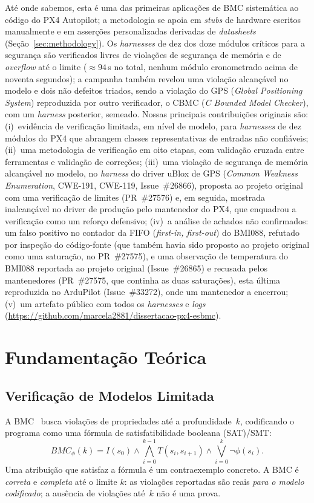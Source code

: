\documentclass[conference]{IEEEtran}
\begin{document}
Até onde sabemos, esta é uma das primeiras aplicações de BMC
sistemática ao código do PX4 Autopilot; a metodologia se apoia em
\textit{stubs} de hardware escritos manualmente e em asserções
personalizadas derivadas de \textit{datasheets}
(Seção~\ref{sec:methodology}). Os \textit{harnesses} de dez dos doze
módulos críticos para a segurança são verificados livres de violações
de segurança de memória e de \textit{overflow} até o limite
(${\approx}94$\,s no total, nenhum módulo cronometrado acima de
noventa segundos); a campanha também revelou uma violação alcançável
no modelo e dois não defeitos triados, sendo a violação do GPS
(\textit{Global Positioning System}) reproduzida por outro
verificador, o CBMC (\textit{C Bounded Model Checker}), com um
\textit{harness} posterior, semeado.
Nossas principais contribuições originais são:
(i)~evidência de verificação limitada, em nível de modelo, para
\textit{harnesses} de dez módulos do PX4 que abrangem classes
representativas de entradas não confiáveis;
(ii)~uma metodologia de verificação em oito etapas, com validação
cruzada entre ferramentas e validação de correções;
(iii)~uma violação de segurança de memória alcançável no modelo, no
\textit{harness} do driver uBlox de GPS (\textit{Common Weakness
Enumeration}, CWE-191, CWE-119, Issue~\#26866), proposta ao projeto
original com uma verificação de limites (PR~\#27576) e, em seguida,
mostrada inalcançável no driver de produção pelo mantenedor do PX4,
que enquadrou a verificação como um reforço defensivo;
(iv)~a análise de achados não confirmados: um falso positivo no
contador da FIFO (\textit{first-in, first-out}) do BMI088, refutado
por inspeção do código-fonte (que também havia sido proposto ao
projeto original como uma saturação, no PR~\#27575), e uma observação
de temperatura do BMI088 reportada ao projeto original
(Issue~\#26865) e recusada pelos mantenedores (PR~\#27575, que
continha as duas saturações), esta última reproduzida no ArduPilot
(Issue~\#33272), onde um mantenedor a encerrou;
(v)~um artefato público com todos os \textit{harnesses} e
\textit{logs}
(\url{https://github.com/marcela2881/dissertacao-px4-esbmc}).

\section{Fundamentação Teórica}
\label{sec:background}

\subsection{Verificação de Modelos Limitada}
\label{subsec:bmc}
A BMC~\cite{Biere1999} busca violações de propriedades até a
profundidade~$k$, codificando o programa como uma fórmula de
satisfatibilidade booleana (SAT)/SMT:
\begin{equation}
\mathit{BMC}_\phi(k) =
I(s_0) \wedge
\bigwedge_{i=0}^{k-1} T(s_i, s_{i+1}) \wedge
\bigvee_{i=0}^{k} \neg\phi(s_i).
\label{eq:bmc}
\end{equation}
Uma atribuição que satisfaz a fórmula é um contraexemplo concreto. A
BMC é \emph{correta} e \emph{completa} até o limite $k$: as violações
reportadas são reais \emph{para o modelo codificado}; a ausência de
violações até~$k$ não é uma prova.
\end{document}
